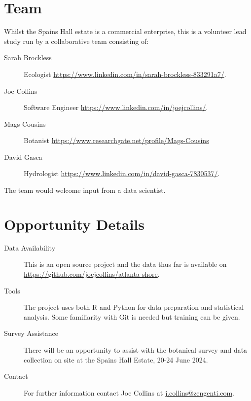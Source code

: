 \documentclass{roles}
\begin{document}
\section*{Team}

Whilst the Spains Hall estate is a commercial enterprise,
this is a volunteer lead study
run by a collaborative team consisting of:

\begin{description}
    \item[Sarah Brockless] Ecologist \href{https://www.linkedin.com/in/sarah-brockless-833291a7/}{https://www.linkedin.com/in/sarah-brockless-833291a7/}.
    \item[Joe Collins] Software Engineer \href{https://www.linkedin.com/in/joejcollins/}{https://www.linkedin.com/in/joejcollins/}.
    \item[Mags Cousins] Botanist \href{https://www.researchgate.net/profile/Mags-Cousins}{https://www.researchgate.net/profile/Mags-Cousins}
    \item[David Gasca] Hydrologist \href{https://www.linkedin.com/in/david-gasca-7830537/}{https://www.linkedin.com/in/david-gasca-7830537/}.
\end{description}

The team would welcome input from a data scientist.

\section*{Opportunity Details}

\begin{description}
    \item[Data Availability] This is an open source project and
        the data thus far is available on \href{https://github.com/joejcollins/atlanta-shore}{https://github.com/joejcollins/atlanta-shore}.
    \item[Tools] The project uses both R and Python for data preparation and statistical analysis.
        Some familiarity with Git is needed but training can be given.
    \item[Survey Assistance] There will be an opportunity to assist with the botanical survey
        and data collection on site at the Spains Hall Estate, 20-24 June 2024.
    \item[Contact] For further information contact Joe Collins at \href{mailto:j.collins@zengenti.com}{j.collins@zengenti.com}.
\end{description}
\end{document}
